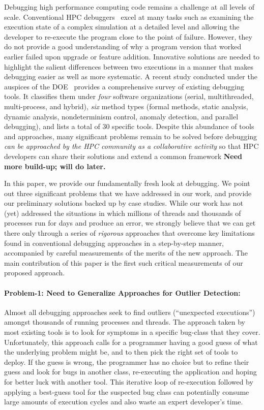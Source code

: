 

Debugging high performance computing code
remains a challenge at all levels of scale.
%
Conventional HPC debuggers~\cite{allinea-ddt,roguewave,others}
excel at many tasks such as examining the execution
state of a complex simulation at a detailed
level and allowing the developer to re-execute
the program close to the point of failure.
%
However, they do not provide a good understanding
of why a program version that worked earlier
failed upon upgrade or feature addition.
%
Innovative solutions are needed to highlight the
salient differences between two executions in a manner
that makes debugging easier as well as more systematic.
%
A recent study conducted under the auspices of the
DOE~\cite{DBLP:journals/corr/GopalakrishnanH17}
provides a comprehensive survey
of existing debugging tools.
%
It classifies them under
{\em four} software organizations (serial, multithreaded,
multi-process, and hybrid), {\em six}
method types (formal methods, static analysis, dynamic
analysis, nondeterminism control, anomaly detection,
and parallel debugging), and lists a total of 30 specific
tools.
%
Despite this abundance of tools and approaches, many
significant problems remain to be solved before debugging
{\em can be approached by the HPC community as a collaborative
activity} so that HPC developers can share their solutions
and extend a common framework
%
{\bf Need more build-up; will do later.}


In this paper, we provide our fundamentally fresh look
at debugging.
%
We point out three significant problems that
we have addressed in our work, and provide our preliminary
solutions backed up by case studies.
%
While our work has not (yet) addressed the situations in
which millions of threads and thousands of processes run
for days and produce an error,
we strongly believe that we can get there only through
a series of {\em rigorous} approaches
that overcome key limitations found in conventional
debugging approaches in a step-by-step manner, accompanied
by careful measurements of the merits of the new approach.
%
The main contribution of this paper is the first such
critical measurements of our proposed approach.


\paragraph{Problem-1: Need to Generalize Approaches for Outlier Detection:\/}
%
Almost all debugging approaches seek to find outliers (``unexpected
executions'') amongst thousands of running processes and threads.
%
The approach taken by most existing tools is to
look for symptoms in a specific bug-class that they
cover.
%
Unfortunately,
this approach calls for a programmer having a good guess of what
the underlying problem might be,
and to then pick the right set of tools to deploy.
%
If the guess is wrong, the programmer has no choice but to
refine their guess
and look for bugs in another class,
re-executing the application and hoping for
better luck with another tool.
%
This iterative loop of re-execution followed by applying a
best-guess tool for the suspected bug class can potentially consume
large amounts of execution cycles and also waste an
expert developer's time.


